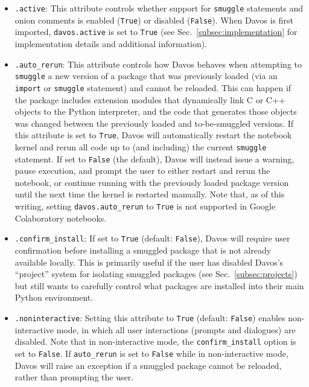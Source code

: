 \documentclass[preprint,12pt,a4paper]{elsarticle}
\begin{document}
\begin{itemize}
\item \texttt{.active}: This attribute controls whether support for \texttt{smuggle}
  statements and onion comments is enabled (\texttt{True}) or
  disabled (\texttt{False}).  When Davos is first imported,
  \texttt{davos.active} is set to \texttt{True} (see Sec.~\ref{subsec:implementation} for implementation details and additional information).

\item \texttt{.auto\_rerun}: This attribute controls how
  Davos behaves when attempting to \texttt{smuggle} a new
  version of a package that was previously loaded (via an \texttt{import} or \texttt{smuggle} statement) and cannot be
  reloaded. This can happen if the package includes extension modules
  that dynamically link C or C++ objects to the Python interpreter,
  and the code that generates those objects was changed between the
  previously loaded and to-be-smuggled versions.  If this attribute
  is set to \texttt{True}, Davos will automatically restart
  the notebook kernel and rerun all code up to (and including) the
  current \texttt{smuggle} statement. If set to \texttt{False} (the default),
  Davos will instead issue a warning, pause execution, and
  prompt the user to either restart and rerun the notebook, or
  continue running with the previously loaded package version until
  the next time the kernel is restarted manually.  Note that, as of
  this writing, setting \texttt{davos.auto\_rerun} to \texttt{True} is not
  supported in Google Colaboratory notebooks.

\item \texttt{.confirm\_install}: If set to \texttt{True} (default:
  \texttt{False}), Davos will require user confirmation
  before installing a smuggled package that is not already
  available locally. This is primarily useful if the user has disabled
  Davos's ``project'' system for isolating smuggled packages (see
  Sec.~\ref{subsec:projects}) but still wants to carefully control what
  packages are installed into their main Python environment.

\item \texttt{.noninteractive}: Setting this attribute to
  \texttt{True} (default: \texttt{False}) enables non-in\-ter\-act\-ive
  mode, in which all user interactions (prompts and dialogues) are
  disabled. Note that in non-interactive mode, the
  \texttt{confirm\_install} option is set to \texttt{False}.  If
  \texttt{auto\_rerun} is set to \texttt{False} while in non-interactive
  mode, Davos will raise an exception if a smuggled package
  cannot be reloaded, rather than prompting the user.


\end{itemize}
\end{document}
